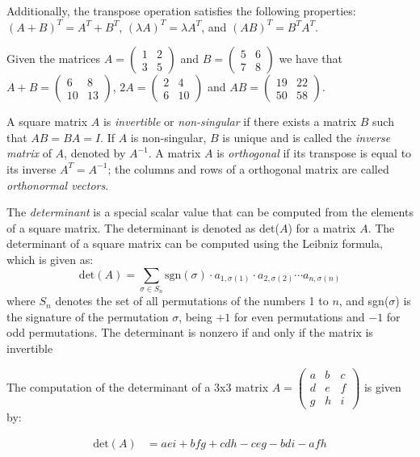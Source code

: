 Additionally, the transpose operation satisfies the following properties: $(A + B)^T = A^T + B^T$, $(\lambda A)^T = \lambda A^T$, and $(A B)^T = B^T A^T$.

\begin{example}
Given the matrices $A = \left( \begin{smallmatrix} 1 & 2 \\ 3 & 5 \end{smallmatrix} \right)$ and $B = \left( \begin{smallmatrix} 5 & 6 \\ 7 & 8 \end{smallmatrix} \right)$ we have that $A + B = \left( \begin{smallmatrix} 6 & 8 \\ 10 & 13 \end{smallmatrix} \right)$, $2 A = \left( \begin{smallmatrix} 2 & 4 \\ 6 & 10 \end{smallmatrix} \right)$ and $A B = \left( \begin{smallmatrix} 19 & 22 \\ 50 & 58 \end{smallmatrix} \right)$.
\end{example}

A square matrix $A$ is \emph{invertible} or \emph{non-singular} if there exists a matrix $B$ such that $AB = BA = I$. If $A$ is non-singular, $B$ is unique and is called the \emph{inverse matrix} of $A$, denoted by $A^{-1}$. A matrix $A$ is \emph{orthogonal} if its transpose is equal to its inverse $A^T = A^{-1}$; the columns and rows of a orthogonal matrix are called \emph{orthonormal vectors}.

The \emph{determinant} is a special scalar value that can be computed from the elements of a square matrix. The determinant is denoted as det($A$) for a matrix $A$. The determinant of a square matrix can be computed using the Leibniz formula, which is given as:
\[
\text{det}(A) = \sum_{\sigma \in S_n} \text{sgn}(\sigma) \cdot a_{1,\sigma(1)} \cdot a_{2,\sigma(2)} \cdots a_{n,\sigma(n)}
\]
where $S_n$ denotes the set of all permutations of the numbers 1 to $n$, and sgn($\sigma$) is the signature of the permutation $\sigma$, being $+1$ for even permutations and $-1$ for odd permutations. The determinant is nonzero if and only if the matrix is invertible

\begin{example}
The computation of the determinant of a 3x3 matrix $A = \left( \begin{smallmatrix} a & b & c \\ d & e & f \\ g & h & i \end{smallmatrix} \right)$ is given by:

\begin{align*}
\text{det}(A) &= aei + bfg + cdh - ceg - bdi - afh
\end{align*}
\end{example}

